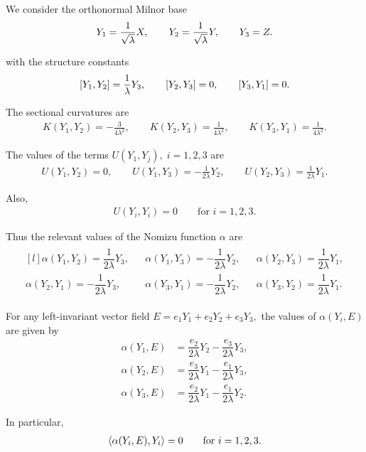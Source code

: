 \documentclass[12pt]{article}
\begin{document}
\noindent We consider the orthonormal Milnor base
\begin{align*}
\noindent
Y_1=\frac{1}{\sqrt{\lambda}}X,
\qquad
Y_2=\frac{1}{\sqrt{\lambda}}Y,
\qquad
Y_3=Z.
\end{align*}

\noindent with the structure constants
\begin{align*}
\noindent
[Y_1,Y_2]=\frac{1}{\lambda}Y_3,
\qquad
[Y_2,Y_3]=0,
\qquad
[Y_3,Y_1]=0.
\end{align*}

\noindent The sectional curvatures are
\begin{align*}
K(Y_1,Y_2)=-\frac{3}{4\lambda^2},
\qquad
K(Y_2,Y_3)=\frac{1}{4\lambda^2},
\qquad
K(Y_3,Y_1)=\frac{1}{4\lambda^2}.
\end{align*}

\noindent The values of the terms $U(Y_1,Y_j),\; i=1,2,3$ are
\begin{align*}
U(Y_1,Y_2)=0,
\qquad
U(Y_1,Y_3)=-\frac{1}{2\lambda}Y_2,
\qquad
U(Y_2,Y_3)=\frac{1}{2\lambda}Y_1.
\end{align*}

\noindent Also,
\begin{align*}
U(Y_i,Y_i)=0
\qquad
\text{for } i=1,2,3.
\end{align*}

\noindent Thus the relevant values of the Nomizu function $\alpha$ are
\begin{align*}
\begin{matrix*}[l]
    \alpha(Y_1,Y_2)=\dfrac{1}{2\lambda}Y_3, &&
\alpha(Y_1,Y_3)=-\dfrac{1}{2\lambda}Y_2, && \alpha(Y_2,Y_3)=\dfrac{1}{2\lambda}Y_1, \\[1em]
\alpha(Y_2,Y_1)=-\dfrac{1}{2\lambda}Y_3, &&
\alpha(Y_3,Y_1)=-\dfrac{1}{2\lambda}Y_2, &&
\alpha(Y_3,Y_2)=\dfrac{1}{2\lambda}Y_1.
\end{matrix*}
\end{align*}

\noindent For any left-invariant vector field $E = e_1Y_1 + e_2Y_2 + e_3Y_3,$ the values of $\alpha(Y_i,E)$ are given by
\begin{align*}
\alpha(Y_1,E) &= \dfrac{e_2}{2\lambda}Y_2 - \dfrac{e_3}{2\lambda}Y_3, \\
\alpha(Y_2,E) &= \dfrac{e_3}{2\lambda}Y_1 -\dfrac{e_1}{2\lambda}Y_3 , \\
\alpha(Y_3,E) &=  \dfrac{e_2}{2\lambda}Y_1-\dfrac{e_1}{2\lambda}Y_2.
\end{align*}

\noindent In particular,
\begin{align*}
\noindent
\langle \alpha(Y_i,E),Y_i\rangle=0
\qquad
\text{for } i=1,2,3.
\end{align*}
\end{document}
